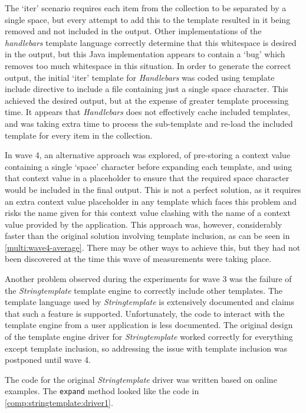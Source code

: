 The `iter' scenario requires each item from the collection to be separated by a single space, but every attempt to add this to the template resulted in it being removed and not included in the output. Other implementations of the \emph{handlebars} template language correctly determine that this whitespace is desired in the output, but this Java implementation appears to contain a `bug' which removes too much whitespace in this situation. In order to generate the correct output, the initial `iter' template for \emph{Handlebars} was coded using template include directive to include a file containing just a single space character. This achieved the desired output, but at the expense of greater template processing time. It appears that \emph{Handlebars} does not effectively cache included templates, and was taking extra time to process the sub-template and re-load the included template for every item in the collection.

In wave 4, an alternative approach was explored, of pre-storing a context value containing a single `space' character before expanding each template, and using that context value in a placeholder to ensure that the required space character would be included in the final output. This is not a perfect solution, as it requires an extra context value placeholder in any template which faces this problem and risks the name given for this context value clashing with the name of a context value provided by the application. This approach was, however, considerably faster than the original solution involving template inclusion, as can be seen in \autoref{multi:wave4-average}. There may be other ways to achieve this, but they had not been discovered at the time this wave of measurements were taking place.

Another problem observed during the experiments for wave 3 was the failure of the \emph{Stringtemplate} template engine to correctly include other templates. The template language used by \emph{Stringtemplate} is extensively documented and claims that such a feature is supported. Unfortunately, the code to interact with the template engine from a user application is less documented. The original design of the template engine driver for \emph{Stringtemplate} worked correctly for everything except template inclusion, so addressing the issue with template inclusion was postponed until wave 4.

The code for the original \emph{Stringtemplate} driver was written based on online examples. The \verb!expand! method looked like the code in \autoref{comp:stringtemplate:driver1}.

